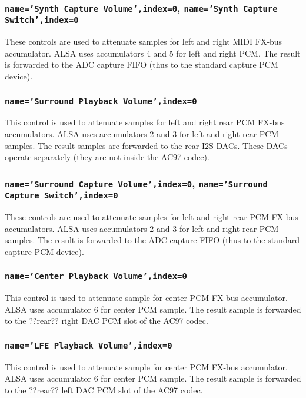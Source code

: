 \documentclass[a4paper,8pt,english]{sphinxmanual}
\begin{document}
\subsubsection{\texttt{name='Synth Capture Volume',index=0}, \texttt{name='Synth Capture Switch',index=0}}
\label{sound/cards/sb-live-mixer:name-synth-capture-volume-index-0-name-synth-capture-switch-index-0}
These controls are used to attenuate samples for left and right MIDI FX-bus
accumulator. ALSA uses accumulators 4 and 5 for left and right PCM.
The result is forwarded to the ADC capture FIFO (thus to the standard capture
PCM device).


\subsubsection{\texttt{name='Surround Playback Volume',index=0}}
\label{sound/cards/sb-live-mixer:name-surround-playback-volume-index-0}
This control is used to attenuate samples for left and right rear PCM FX-bus
accumulators. ALSA uses accumulators 2 and 3 for left and right rear PCM samples.
The result samples are forwarded to the rear I2S DACs. These DACs operate
separately (they are not inside the AC97 codec).


\subsubsection{\texttt{name='Surround Capture Volume',index=0}, \texttt{name='Surround Capture Switch',index=0}}
\label{sound/cards/sb-live-mixer:name-surround-capture-volume-index-0-name-surround-capture-switch-index-0}
These controls are used to attenuate samples for left and right rear PCM FX-bus
accumulators. ALSA uses accumulators 2 and 3 for left and right rear PCM samples.
The result is forwarded to the ADC capture FIFO (thus to the standard capture
PCM device).


\subsubsection{\texttt{name='Center Playback Volume',index=0}}
\label{sound/cards/sb-live-mixer:name-center-playback-volume-index-0}
This control is used to attenuate sample for center PCM FX-bus accumulator.
ALSA uses accumulator 6 for center PCM sample. The result sample is forwarded
to the ??rear?? right DAC PCM slot of the AC97 codec.


\subsubsection{\texttt{name='LFE Playback Volume',index=0}}
\label{sound/cards/sb-live-mixer:name-lfe-playback-volume-index-0}
This control is used to attenuate sample for center PCM FX-bus accumulator.
ALSA uses accumulator 6 for center PCM sample. The result sample is forwarded
to the ??rear?? left DAC PCM slot of the AC97 codec.
\end{document}
